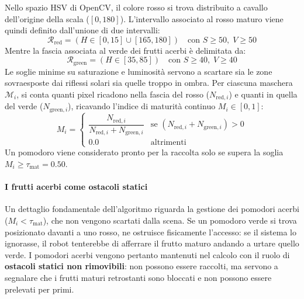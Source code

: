Nello spazio HSV di OpenCV, il colore rosso si trova distribuito a cavallo dell'origine della scala ($[0, 180]$). L'intervallo associato al rosso maturo viene quindi definito dall'unione di due intervalli:
\begin{equation}
    \mathcal{R}_{\text{red}} = (H \in [0, 15] \cup [165, 180]) \quad \text{con } S \ge 50, \; V \ge 50
    \label{eq:hsv_rosso}
\end{equation}
Mentre la fascia associata al verde dei frutti acerbi è delimitata da:
\begin{equation}
    \mathcal{R}_{\text{green}} = (H \in [35, 85]) \quad \text{con } S \ge 40, \; V \ge 40
    \label{eq:hsv_verde}
\end{equation}
Le soglie minime su saturazione e luminosità servono a scartare sia le zone sovraesposte dai riflessi solari sia quelle troppo in ombra. Per ciascuna maschera $\mathcal{M}_i$, si conta quanti pixel ricadono nella fascia del rosso ($N_{\text{red}, i}$) e quanti in quella del verde ($N_{\text{green}, i}$), ricavando l'indice di maturità continuo $M_i \in [0, 1]$:
\begin{equation}
    M_i = 
    \begin{cases}
        \dfrac{N_{\text{red}, i}}{N_{\text{red}, i} + N_{\text{green}, i}} & \text{se } \left( N_{\text{red}, i} + N_{\text{green}, i} \right) > 0 \\[8pt]
        0.0 & \text{altrimenti}
    \end{cases}
    \label{eq:indice_maturita}
\end{equation}
Un pomodoro viene considerato pronto per la raccolta solo se supera la soglia $M_i \ge \tau_{\text{mat}} = 0.50$.

\paragraph{I frutti acerbi come ostacoli statici}
Un dettaglio fondamentale dell'algoritmo riguarda la gestione dei pomodori acerbi ($M_i < \tau_{\text{mat}}$), che non vengono scartati dalla scena. Se un pomodoro verde si trova posizionato davanti a uno rosso, ne ostruisce fisicamente l'accesso: se il sistema lo ignorasse, il robot tenterebbe di afferrare il frutto maturo andando a urtare quello verde. I pomodori acerbi vengono pertanto mantenuti nel calcolo con il ruolo di \textbf{ostacoli statici non rimovibili}: non possono essere raccolti, ma servono a segnalare che i frutti maturi retrostanti sono bloccati e non possono essere prelevati per primi.

